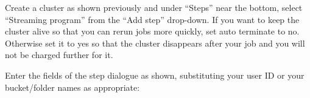\begin{fullwidth}
 \hspace{20pt}

\step Create a cluster as shown previously and under ``Steps'' near the bottom, select ``Streaming program'' from the ``Add step'' drop-down. If you want to keep the cluster alive so that you can rerun jobs more quickly, set auto terminate to no. Otherwise set it to yes so that the cluster disappears after your job and you will not be charged further for it. 

\step Enter the fields of the step dialogue as shown, substituting your user ID or your bucket/folder names as appropriate:

\noindent{}


\end{fullwidth}
